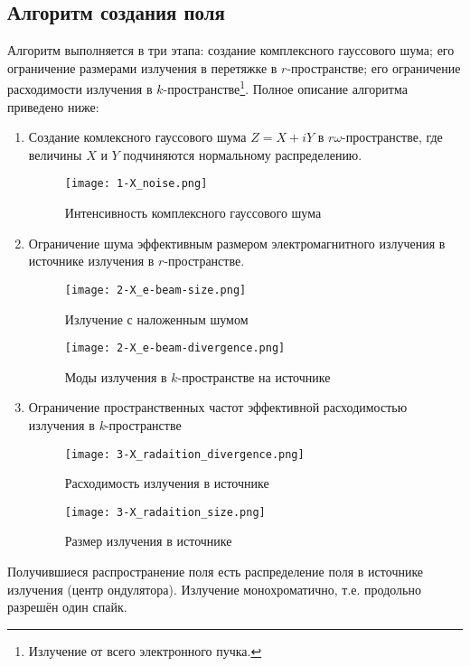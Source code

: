 \subsection{Алгоритм создания поля}
Алгоритм выполняется в три этапа: создание комплексного гауссового шума; его ограничение размерами излучения в перетяжке в $r$-пространстве; его ограничение расходимости излучения в $k$-пространстве\footnote{Излучение от всего электронного пучка.}. Полное описание алгоритма приведено ниже: 
\begin{enumerate}
\item \label{noise} Создание комлексного гауссового шума $Z = X + iY$ в $r\omega$-пространстве, где величины $X$ и $Y$ подчиняются нормальному распределению.
\begin{figure}[H] 
	\centering 	\texttt{[image: 1-X\_noise.png]}
	\caption{Интенсивность комплексного гауссового шума}
	\label{fig:1-noise}
\end{figure}
\item \label{beam_s} Ограничение шума эффективным размером электромагнитного излучения в источнике излучения в \textit{$r$}-пространстве.
\begin{figure}[H]
	\centering
	\begin{minipage}{0.45\textwidth}
		\centering
		\texttt{[image: 2-X\_e-beam-size.png]}
		\caption{Излучение с наложенным шумом}
		\label{fig:2-beam_size_k}
	\end{minipage}
	\begin{minipage}{0.45\textwidth}
		\centering
		\texttt{[image: 2-X\_e-beam-divergence.png]}
		\caption{Моды излучения в $k$-пространстве на источнике}
		\label{fig:2-beam_size_s}
	\end{minipage}\hfill
\end{figure}
\item \label{beam_k} Ограничение пространственных частот эффективной расходимостью излучения в \textit{k}-пространстве
\begin{figure}[H]
	\centering
	\begin{minipage}{0.45\textwidth}
		\centering
		\texttt{[image: 3-X\_radaition\_divergence.png]}
		\caption{Расходимость излучения в источнике}
		\label{fig:3-beam_s}
	\end{minipage}
	\begin{minipage}{0.45\textwidth}
		\centering
		\texttt{[image: 3-X\_radaition\_size.png]}
		\caption{Размер излучения в источнике}
		\label{fig:3-beam_k}
	\end{minipage}
\end{figure}
\end{enumerate}
\noindent Получившиеся распространение поля есть распределение поля в источнике излучения (центр ондулятора). Излучение монохроматично, т.е. продольно разрешён один спайк.

